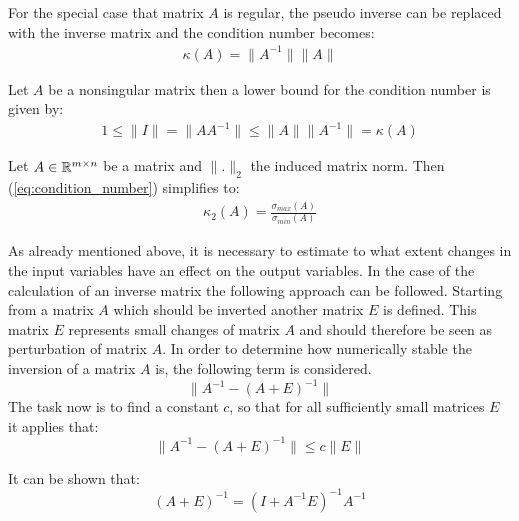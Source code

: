 \begin{remark}
	For the special case that matrix $A$ is regular, the pseudo inverse can be replaced with the inverse matrix and the condition number becomes:
	\begin{align}
	\kappa(A) = \lVert A^{-1} \rVert \lVert A \rVert
	\end{align}	
\end{remark}

\begin{remark}
	Let $A$ be a nonsingular matrix then a lower bound for the condition number is given by: 
	\begin{align*}
	 1 \leq \lVert I \rVert = \lVert A A^{-1} \rVert \leq \lVert A \rVert \lVert A^{-1} \rVert = \kappa(A)
	\end{align*}
\end{remark}

\begin{remark}
	Let $A \in \mathbb{R}^{m \times n}$ be a matrix and $\lVert . \rVert_2$ the induced matrix norm. Then (\ref{eq:condition_number}) simplifies to: 
	\begin{align*}
		\kappa_2(A) = \frac{\sigma_{max}(A)}{\sigma_{min}(A)}
	\end{align*}	
\end{remark}

As already mentioned above, it is necessary to estimate to what extent changes in the input variables have an effect on the output variables. In the case of the calculation of an inverse matrix the following approach can be followed. Starting from a matrix $A$ which should be inverted another matrix $E$ is defined. This matrix $E$ represents small changes of matrix $A$ and should therefore be seen as perturbation of matrix $A$. In order to determine how numerically stable the inversion of a matrix $A$ is, the following term is considered.
\begin{equation}\label{eq:stable}
	\lVert A^{-1} - (A + E)^{-1} \rVert
\end{equation}
The task now is to find a constant $c$, so that for all sufficiently small matrices $E$ it applies that:
\begin{equation}
	\lVert A^{-1} - (A + E)^{-1} \rVert \leq c \lVert E \rVert
\end{equation}
 
\begin{remark}\label{eq:simplify}
	It can be shown that:
	\begin{equation*}
		(A + E)^{-1} = (I + A^{-1}E)^{-1}A^{-1}
	\end{equation*}
\end{remark}

